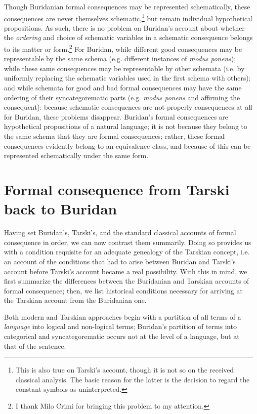 \documentclass[]{article}
\begin{document}
Though Buridanian formal consequences may be represented schematically, these consequences are never themselves schematic,\footnote{This is also true on Tarski's account, though it is not so on the received classical analysis. The basic reason for the latter is the decision to regard the constant symbols as uninterpreted.} but remain individual hypothetical propositions. As such, there is no problem on Buridan's account about whether the \textit{ordering} and choice of schematic variables in a schematic consequence belongs to its matter or form.\footnote{I thank Milo Crimi for bringing this problem to my attention.} For Buridan, while different good consequences may be representable by the same schema (e.g. different instances of \textit{modus ponens}); while these same consequences may be representable by other schemata (i.e. by uniformly replacing the schematic variables used in the first schema with others); and while schemata for good and bad formal consequences may have the same ordering of their syncategorematic parts (e.g. \textit{modus ponens} and affirming the consequent): because schematic consequences are not properly consequences at all for Buridan, these problems disappear. Buridan's formal consequences are hypothetical propositions of a natural language; it is not because they belong to the same schema that they are formal consequences; rather, these formal consequences evidently belong to an equivalence class, and because of this can be represented schematically under the same form.
\section{Formal consequence from Tarski back to Buridan}
Having set Buridan's, Tarski's, and the standard classical accounts of formal consequence in order, we can now contrast them summarily. Doing so provides us with a condition requisite for an adequate genealogy of the Tarskian concept, i.e. an account of the conditions that had to arise between Buridan and Tarski's account before Tarski's account became a real possibility. With this in mind, we first summarize the differences between the Buridanian and Tarskian accounts of formal consequence; then, we list historical conditions necessary for arriving at the Tarskian account from the Buridanian one.

Both modern and Tarskian approaches begin with a partition of all terms of a \textit{language} into logical and non-logical terms; Buridan's partition of terms into categorical and syncategorematic occurs not at the level of a language, but at that of the sentence. 
\end{document}
